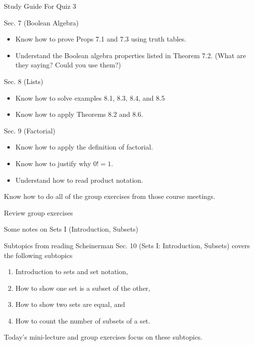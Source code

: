 \documentclass[10pt]{beamer}
\begin{document}
\begin{frame}{Study Guide For Quiz 3}

\footnotesize 
\begin{myredbox}[title=Readings]
Sec. 7 (Boolean Algebra)
\begin{itemize}
\item Know how to prove Props 7.1 and 7.3 using truth tables.
\item Understand the Boolean algebra properties listed in Theorem 7.2.  (What are they saying? Could you use them?)
\end{itemize}
Sec. 8 (Lists)
\begin{itemize}
\item Know how to solve examples 8.1, 8.3, 8.4, and 8.5
\item Know how to apply Theorems 8.2 and 8.6. 
\end{itemize}
Sec. 9 (Factorial)
\begin{itemize}
\item Know how to apply the definition of factorial.
\item Know how to justify why $0!=1$.
\item Understand how to read product notation.
\end{itemize}

\end{myredbox}

\vfill 

\begin{myyellowbox}[title=Group exercises]
Know how to do all of the group exercises from those course meetings.
\end{myyellowbox}

\end{frame}

\begin{frame}[standout]
Review group exercises
\end{frame}



\begin{frame}[standout]
Some notes on Sets I (Introduction, Subsets) 
\end{frame}


\begin{frame}{Subtopics from reading}
Scheinerman Sec. 10 (Sets I: Introduction, Subsets) covers the following subtopics
\begin{enumerate}
	\item Introduction to sets and set notation,
	\item How to show one set is a subset of the other,
	\item How to show two sets are equal, and
	\item How to count the number of subsets of a set.
\end{enumerate}

\vfill
Today's mini-lecture and group exercises focus on these subtopics. 
\end{frame}
\end{document}
